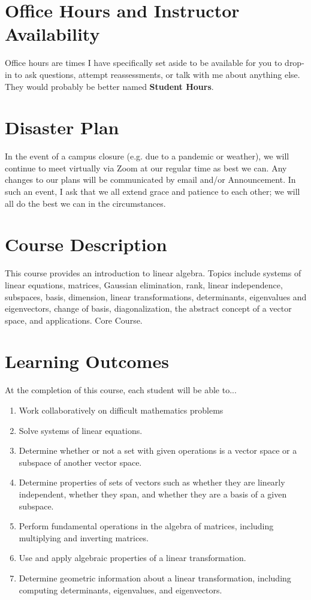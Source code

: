 \documentclass{article}
\begin{document}
\section*{\fontsize{12}{15}\selectfont Office Hours and Instructor Availability}

Office hours are times I have specifically set aside to be available for you to drop-in to ask questions, attempt reassessments, or talk with me about anything else. They would probably be better named \textbf{Student Hours}.  

\section*{\fontsize{12}{15}\selectfont Disaster Plan}
In the event of a campus closure (e.g. due to a pandemic or weather), we will continue to meet virtually via Zoom at our regular time as best we can. Any changes to our plans will be communicated by email and/or \LMS Announcement. In such an event, I ask that we all extend grace and patience to each other; we will all do the best we can in the circumstances.

\section*{\fontsize{12}{15}\selectfont Course Description}
This course provides an introduction to linear algebra. Topics include systems of linear equations, matrices, Gaussian elimination, rank, linear independence, subspaces, basis, dimension, linear transformations, determinants, eigenvalues and eigenvectors, change of basis, diagonalization, the abstract concept of a vector space, and applications. Core Course.

\section*{\fontsize{12}{15}\selectfont Learning Outcomes}
At the completion of this course, each student will be able to...
\begin{enumerate}[1)]
\item Work collaboratively on difficult mathematics problems
\item Solve systems of linear equations.
\item Determine whether or not a set with given operations is a vector space or a subspace of another vector space.
\item Determine properties of sets of vectors such as whether they are linearly independent, whether they span, and whether they are a basis of a given subspace.
\item Perform fundamental operations in the algebra of matrices, including multiplying and inverting matrices.
\item Use and apply algebraic properties of a linear transformation.
\item Determine geometric information about a linear transformation, including computing determinants, eigenvalues, and eigenvectors.
\end{enumerate}
\end{document}
